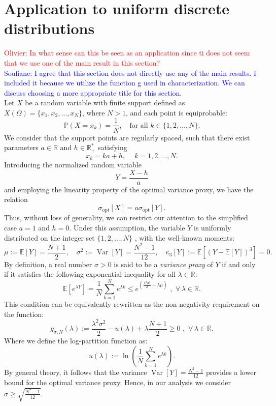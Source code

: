 \documentclass[a4paper, 10pt]{article}
\newcommand{\E}{\mathbb{E}}
\newcommand{\beq}{\begin{equation}}
\newcommand{\eeq}{\end{equation}}
\theoremstyle{definition}
\begin{document}
\section{Application to uniform discrete distributions}\label{sec:uniform}
\textcolor{red}{Olivier: In what sense can this be seen as an application since ti does not seem that we use one of the main result in this section?}\\
\textcolor{blue}{Soufiane: I agree that this section does not directly use any of the main results. I included it because we utilize the function g used in characterization. We can discuss choosing a more appropriate title for this section.}\\
Let \( X \) be a random variable with finite support defined as \(X(\Omega)=\{x_1, x_2, \ldots, x_N\}\), where $N>1$, and each point is equiprobable: 
\[
  \mathbb{P}(X = x_k) = \frac{1}{N}, \quad \text{for all } k \in \{1,2,\dots,N\}.
\]
We consider that the support points are regularly spaced, such that there exist parameters \( a \in \mathbb{R} \) and  \( h \in  \mathbb{R}^{*}_{+} \) satisfying
 \[
 x_k = ka  + h , \quad \ k = 1,2,\dots,N.
 \]
Introducing the normalized random variable
 \[
 Y = \frac{X-h}{a}
 \]
and employing the linearity property of the optimal variance proxy, we have the relation
\[
\sigma_{\mathrm{opt}}[X] = a\sigma_{\mathrm{opt}}[Y].
\]
Thus, without loss of generality, we can restrict our attention to the simplified case $a=1$ and $h=0$. Under this assumption, the variable $Y$ is uniformly distributed on the integer set $\{1, 2, \ldots, N\}$ , with the well-known moments:
\beq
  \mu:=\E[Y]=\frac{N+1}{2}, \quad  \sigma^2:=\operatorname{Var}[Y]=\frac{N^2-1}{12}, \quad \operatorname{\kappa_3}[Y] := \E[(Y-\E[Y])^3]=0.
\eeq
By definition, a real number $\sigma>0$ is said to be a \emph{variance proxy} of $Y$  if and only if it satisfies the following exponential inequality for all $\lambda \in \mathbb{R}$:
\beq
\E\left[e^{\lambda Y}\right]=  \frac{1}{N}\sum_{k=1}^{N} e^{\lambda k} \leq e^{\left(\frac{\lambda^2\sigma^2}{2}+\lambda \mu\right)} \,\, ,\,\, \forall \, \lambda\in \mathbb{R}.
\eeq
This condition can be equivalently rewritten as the non-negativity requirement on the function:
\beq
g_{\sigma,N}(\lambda):=\frac{\lambda^2\sigma^2}{2}-u(\lambda)+\lambda \frac{N+1}{2} \geq 0 \,\,,\,\,  \forall \, \lambda\in \mathbb{R}.
\eeq
Where we define the log-partition function as:
\[
u(\lambda) := \ln\left(\frac{1}{N}\sum_{k=1}^{N} e^{\lambda k}\right).
\]
By general theory, it follows that the variance $\operatorname{Var}[Y]=\frac{N^2-1}{12}$ provides a lower bound for the optimal variance proxy. Hence, in our analysis we consider $\sigma\geq \sqrt{\frac{N^2-1}{12}}$.\\
\end{document}
